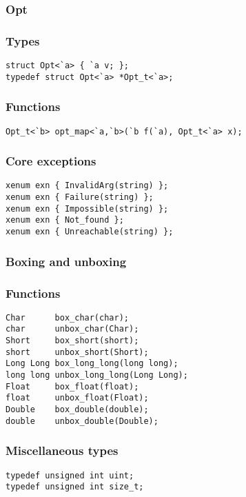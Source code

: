 \subsubsection*{Opt}
\subsubsection*{Types}
\begin{verbatim}
struct Opt<`a> { `a v; };
typedef struct Opt<`a> *Opt_t<`a>;
\end{verbatim}

\subsubsection*{Functions}
\begin{verbatim}
Opt_t<`b> opt_map<`a,`b>(`b f(`a), Opt_t<`a> x);
\end{verbatim}

\subsubsection*{Core exceptions}
\begin{verbatim}
xenum exn { InvalidArg(string) };
xenum exn { Failure(string) };
xenum exn { Impossible(string) };
xenum exn { Not_found };
xenum exn { Unreachable(string) };
\end{verbatim}

\subsubsection*{Boxing and unboxing}
\subsubsection*{Functions}
\begin{verbatim}
Char      box_char(char);
char      unbox_char(Char);
Short     box_short(short);
short     unbox_short(Short);
Long Long box_long_long(long long);
long long unbox_long_long(Long Long);
Float     box_float(float);
float     unbox_float(Float);
Double    box_double(double);
double    unbox_double(Double);
\end{verbatim}

\subsubsection*{Miscellaneous types}
\begin{verbatim}
typedef unsigned int uint;
typedef unsigned int size_t;
\end{verbatim}

